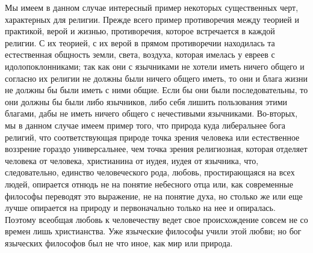 \documentclass[12pt]{article}
\begin{document}
Мы имеем в данном случае интересный пример некоторых существенных черт, характерных для религии. Прежде всего пример противоречия между теорией и практикой, верой и жизнью, противоречия, которое встречается в каждой религии. С их теорией, с их верой в прямом противоречии находилась та естественная общность земли, света, воздуха, которая имелась у евреев с идолопоклонниками; так как они с язычниками не хотели иметь ничего общего и согласно их религии не должны были ничего общего иметь, то они и блага жизни не должны бы были иметь с ними общие. Если бы они были последовательны, то они должны бы были либо язычников, либо себя лишить пользования этими благами, дабы не иметь ничего общего с нечестивыми язычниками. Во-вторых, мы в данном случае имеем пример того, что природа куда либеральнее бога религий, что соответствующая природе точка зрения человека или естественное воззрение гораздо универсальнее, чем точка зрения религиозная, которая отделяет человека от человека, христианина от иудея, иудея от язычника, что, следовательно, единство человеческого рода, любовь, простирающаяся на всех людей, опирается отнюдь не на понятие небесного отца или, как современные философы переводят это выражение, не на понятие духа, но столько же или еще лучше опирается на природу и первоначально только на нее и опиралась. Поэтому всеобщая любовь к человечеству ведет свое происхождение совсем не со времен лишь христианства. Уже языческие философы учили этой любви; но бог языческих философов был не что иное, как мир или природа. 
\end{document}
